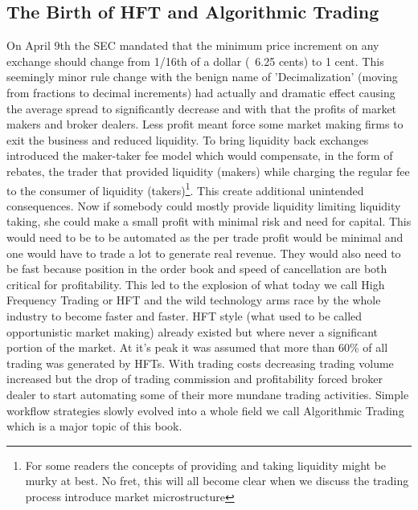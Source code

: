 \subsection{The Birth of HFT and Algorithmic Trading}
On April 9th the SEC mandated that the minimum price increment on any exchange should change from 1/16th of a dollar (~6.25 cents) to 1 cent. This seemingly  minor rule change with the benign name of 'Decimalization' (moving from fractions to decimal increments) had actually and dramatic effect causing the average spread to significantly decrease and with that the profits of market makers and broker dealers. Less profit meant force some market making firms to exit the business and reduced liquidity. To bring liquidity back exchanges introduced the maker-taker fee model which would compensate, in the form of rebates, the trader that provided liquidity (makers) while charging the regular fee to the consumer of liquidity (takers)\footnote{For some readers the concepts of providing and taking liquidity might be murky at best. No fret, this will all become clear when we discuss the trading process introduce market microstructure}. This create additional unintended consequences. Now if somebody could mostly provide liquidity limiting liquidity taking, she could make a small profit with minimal risk and need for capital. This would need to be to be automated as the per trade profit would be minimal and one would have to trade a lot to generate real revenue. They would also need to be fast because position in the order book and speed of cancellation
are both critical for profitability. This led to the explosion of what today we call High Frequency Trading or HFT and the wild technology arms race by the whole industry to become faster and faster. HFT style (what used to be called opportunistic market making) already existed but where never a significant portion of the market. At it's peak it was assumed that more than 60\% of all trading was generated by HFTs. With trading costs decreasing trading volume increased but the drop of trading commission and profitability forced broker dealer to start automating some of their more mundane trading activities. Simple workflow strategies slowly evolved into a whole field we call Algorithmic Trading which is a major topic of this book.  

